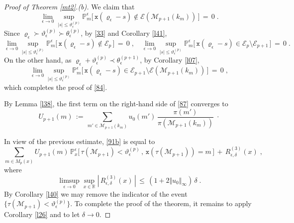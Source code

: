 \documentclass[reqno]{amsart}
\theoremstyle{plain}
\theoremstyle{definition}
\newcommand{\bb}[1]{{\mathbb #1}}
\newcommand{\ms}[1]{{\mathscr #1}}
\newcommand{\mtt}[1]{{\mathtt #1}}
\newcounter{as}[section]
\newcommand{\<}{\langle}
\renewcommand{\>}{\rangle}
\begin{document}
\begin{proof}[Proof of Theorem \ref{mt2}.{\rm (b)}]
We claim that
\begin{equation}
\label{84}
\lim_{\epsilon\to 0} \sup_{|s| \le \vartheta^{(p)}_\epsilon}
\bb P^{\epsilon}_m\big[ \, 
\mtt x(\varrho_\epsilon - s) \not\in  \ms E(\ms M_{p+1}(k_m)) \,\big] \,=\, 0\;.
\end{equation}
Since
$\varrho_\epsilon \succ \vartheta^{(p)}_\epsilon \succ
\theta^{(p)}_\epsilon$, by \eqref{33} and Corollary \ref{l41},
\begin{equation*}
\lim_{\epsilon\to 0} \sup_{|s| \le \vartheta^{(p)}_\epsilon}
\bb P^{\epsilon}_m\big[ \, 
\mtt x(\varrho_\epsilon - s) \not\in \ms E_p
\,\big] \,=\, 0\;, \quad
\lim_{\epsilon\to 0} \sup_{|s| \le \vartheta^{(p)}_\epsilon}
\bb P^{\epsilon}_m\big[ \, 
\mtt x(\varrho_\epsilon - s) \in \ms E_p
\setminus \ms E_{p+1} \,\big] \,=\, 0 \;.
\end{equation*}
On the other hand, as
$\varrho_\epsilon + \vartheta^{(p)}_\epsilon \prec
\theta^{(p+1)}_\epsilon$, by Corollary \ref{l07},
\begin{equation*}
\lim_{\epsilon\to 0} \sup_{|s| \le \vartheta^{(p)}_\epsilon}
\bb P^{\epsilon}_m\big[ \, 
\mtt x(\varrho_\epsilon - s) \in \ms E_{p+1}
\setminus \ms E(\ms M_{p+1}(k_m)) \,\big] \,=\, 0 \;,
\end{equation*}
which completes the proof of \eqref{84}.

By Lemma \ref{l38}, the first term on the right-hand side of
\eqref{87} converges to
\begin{equation*}
U_{p+1} (m) \, :=\,
\sum_{m'\in \ms M_{p+1}(k_m)}  u_0(m')\,
\frac{\pi(m')}{\pi(\ms M_{p+1}(k_m))}\;\cdot
\end{equation*}

In view of the previous
estimate, \eqref{91b} is equal to
\begin{equation*}
\sum_{m\in M_p(x)} U_{p+1} (m) \, \bb P^{\epsilon}_{x}
\big[ \, \tau(\ms M_{p+1}) <
\vartheta^{(p)}_\epsilon\,,\,
\mtt x(\tau(\ms M_{p+1})) = m \,\big] \,+\, R^{(3)}_{\epsilon, \delta} (x)\;,
\end{equation*}
where
\begin{equation*}
\limsup_{\epsilon\to 0} \sup_{x\in\bb R}
|\, R^{(3)}_{\epsilon, \delta} (x) \,| \,\le
\, (1+ 2\Vert u_0\Vert_\infty) \, \delta  \;.
\end{equation*}
By Corollary \ref{l40} we may remove the indicator of the event
$\{ \tau(\ms M_{p+1}) < \vartheta^{(p)}_\epsilon\}$. To complete the proof
of the theorem, it remains to apply Corollary \ref{l26} and to let
$\delta\to 0$.
\end{proof}
\end{document}
